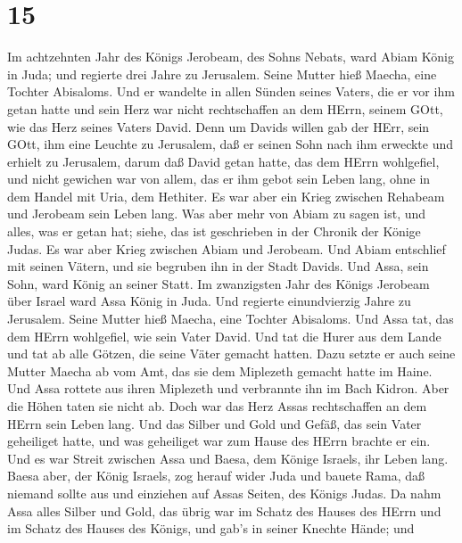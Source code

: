 \hypertarget{section-14}{%
\section{15}\label{section-14}}

 Im achtzehnten Jahr des Königs Jerobeam, des Sohns Nebats,
ward Abiam König in Juda;  und regierte drei Jahre zu
Jerusalem. Seine Mutter hieß Maecha, eine Tochter Abisaloms.
 Und er wandelte in allen Sünden seines Vaters, die er vor
ihm getan hatte und sein Herz war nicht rechtschaffen an dem HErrn,
seinem GOtt, wie das Herz seines Vaters David.  Denn um
Davids willen gab der HErr, sein GOtt, ihm eine Leuchte zu Jerusalem,
daß er seinen Sohn nach ihm erweckte und erhielt zu Jerusalem,
 darum daß David getan hatte, das dem HErrn wohlgefiel, und
nicht gewichen war von allem, das er ihm gebot sein Leben lang, ohne in
dem Handel mit Uria, dem Hethiter.  Es war aber ein Krieg
zwischen Rehabeam und Jerobeam sein Leben lang.  Was aber
mehr von Abiam zu sagen ist, und alles, was er getan hat; siehe, das ist
geschrieben in der Chronik der Könige Judas. Es war aber Krieg zwischen
Abiam und Jerobeam.  Und Abiam entschlief mit seinen Vätern,
und sie begruben ihn in der Stadt Davids. Und Assa, sein Sohn, ward
König an seiner Statt.  Im zwanzigsten Jahr des Königs
Jerobeam über Israel ward Assa König in Juda.  Und regierte
einundvierzig Jahre zu Jerusalem. Seine Mutter hieß Maecha, eine Tochter
Abisaloms.  Und Assa tat, das dem HErrn wohlgefiel, wie
sein Vater David.  Und tat die Hurer aus dem Lande und tat
ab alle Götzen, die seine Väter gemacht hatten.  Dazu
setzte er auch seine Mutter Maecha ab vom Amt, das sie dem Miplezeth
gemacht hatte im Haine. Und Assa rottete aus ihren Miplezeth und
verbrannte ihn im Bach Kidron.  Aber die Höhen taten sie
nicht ab. Doch war das Herz Assas rechtschaffen an dem HErrn sein Leben
lang.  Und das Silber und Gold und Gefäß, das sein Vater
geheiliget hatte, und was geheiliget war zum Hause des HErrn brachte er
ein.  Und es war Streit zwischen Assa und Baesa, dem Könige
Israels, ihr Leben lang.  Baesa aber, der König Israels,
zog herauf wider Juda und bauete Rama, daß niemand sollte aus und
einziehen auf Assas Seiten, des Königs Judas.  Da nahm Assa
alles Silber und Gold, das übrig war im Schatz des Hauses des HErrn und
im Schatz des Hauses des Königs, und gab's in seiner Knechte Hände; und
